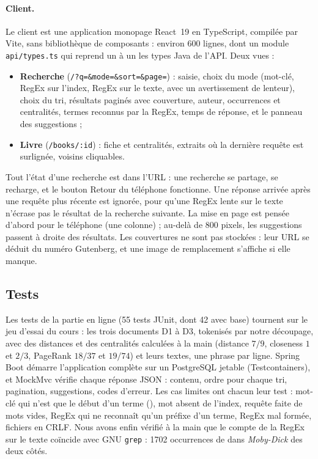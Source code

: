 \paragraph{Client.} Le client est une application monopage React~19 en
TypeScript, compilée par Vite, sans bibliothèque de composants : environ 600
lignes, dont un module \texttt{api/types.ts} qui reprend un à un les types Java de
l'API. Deux vues :
\begin{itemize}
  \item \textbf{Recherche} (\texttt{/?q=\&mode=\&sort=\&page=}) : saisie, choix du
        mode (mot-clé, RegEx sur l'index, RegEx sur le texte, avec un
        avertissement de lenteur), choix du tri, résultats paginés avec
        couverture, auteur, occurrences et centralités, termes reconnus par la
        RegEx, temps de réponse, et le panneau des suggestions ;
  \item \textbf{Livre} (\texttt{/books/:id}) : fiche et centralités, extraits où
        la dernière requête est surlignée, voisins cliquables.
\end{itemize}
Tout l'état d'une recherche est dans l'URL : une recherche se partage, se
recharge, et le bouton Retour du téléphone fonctionne. Une réponse arrivée après
une requête plus récente est ignorée, pour qu'une RegEx lente sur le texte
n'écrase pas le résultat de la recherche suivante. La mise en page est pensée
d'abord pour le téléphone (une colonne) ; au-delà de 800 pixels, les suggestions
passent à droite des résultats. Les couvertures ne sont pas stockées : leur
URL se déduit du numéro Gutenberg, et une image de remplacement s'affiche si
elle manque.

\subsection{Tests}
\label{sec:tests}

Les tests de la partie en ligne (55 tests JUnit, dont 42 avec base) tournent sur
le jeu d'essai du cours : les trois documents D1 à D3, tokenisés
par notre découpage, avec des distances et des centralités calculées à la main
(distance $7/9$, closeness $1$ et $2/3$, PageRank $18/37$ et $19/74$) et leurs
textes, une phrase par ligne. Spring Boot démarre l'application complète sur un
PostgreSQL jetable (Testcontainers), et MockMvc vérifie chaque réponse JSON :
contenu, ordre pour chaque tri, pagination, suggestions, codes d'erreur. Les cas
limites ont chacun leur test : mot-clé qui n'est que le début d'un terme
(), mot absent de l'index, requête faite de mots vides, RegEx qui ne
reconnaît qu'un préfixe d'un terme, RegEx mal formée, fichiers en CRLF. Nous
avons enfin vérifié à la main que le compte de la RegEx sur le texte coïncide
avec GNU \texttt{grep} : 1702 occurrences de  dans
\emph{Moby-Dick} des deux côtés.

